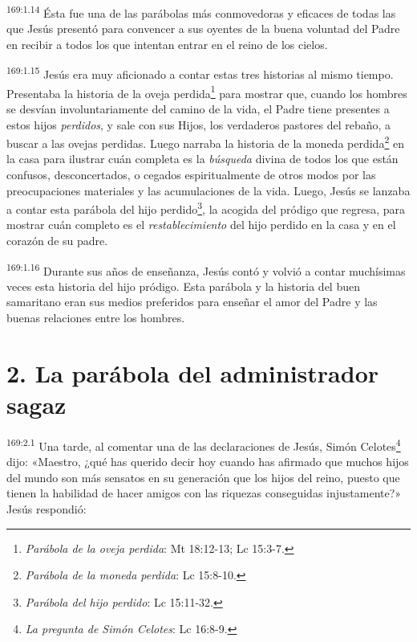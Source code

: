 \par
\textsuperscript{169:1.14} Ésta fue una de las parábolas más conmovedoras y eficaces de todas las que Jesús presentó para convencer a sus oyentes de la buena voluntad del Padre en recibir a todos los que intentan entrar en el reino de los cielos.

\par
\textsuperscript{169:1.15} Jesús era muy aficionado a contar estas tres historias al mismo tiempo. Presentaba la historia de la oveja perdida\footnote{\textit{Parábola de la oveja perdida}: Mt 18:12-13; Lc 15:3-7.} para mostrar que, cuando los hombres se desvían involuntariamente del camino de la vida, el Padre tiene presentes a estos hijos \textit{perdidos}, y sale con sus Hijos, los verdaderos pastores del rebaño, a buscar a las ovejas perdidas. Luego narraba la historia de la moneda perdida\footnote{\textit{Parábola de la moneda perdida}: Lc 15:8-10.} en la casa para ilustrar cuán completa es la \textit{búsqueda} divina de todos los que están confusos, desconcertados, o cegados espiritualmente de otros modos por las preocupaciones materiales y las acumulaciones de la vida. Luego, Jesús se lanzaba a contar esta parábola del hijo perdido\footnote{\textit{Parábola del hijo perdido}: Lc 15:11-32.}, la acogida del pródigo que regresa, para mostrar cuán completo es el \textit{restablecimiento} del hijo perdido en la casa y en el corazón de su padre.

\par
\textsuperscript{169:1.16} Durante sus años de enseñanza, Jesús contó y volvió a contar muchísimas veces esta historia del hijo pródigo. Esta parábola y la historia del buen samaritano eran sus medios preferidos para enseñar el amor del Padre y las buenas relaciones entre los hombres.

\section*{2. La parábola del administrador sagaz}
\par
\textsuperscript{169:2.1} Una tarde, al comentar una de las declaraciones de Jesús, Simón Celotes\footnote{\textit{La pregunta de Simón Celotes}: Lc 16:8-9.} dijo: «Maestro, ¿qué has querido decir hoy cuando has afirmado que muchos hijos del mundo son más sensatos en su generación que los hijos del reino, puesto que tienen la habilidad de hacer amigos con las riquezas conseguidas injustamente?» Jesús respondió:

